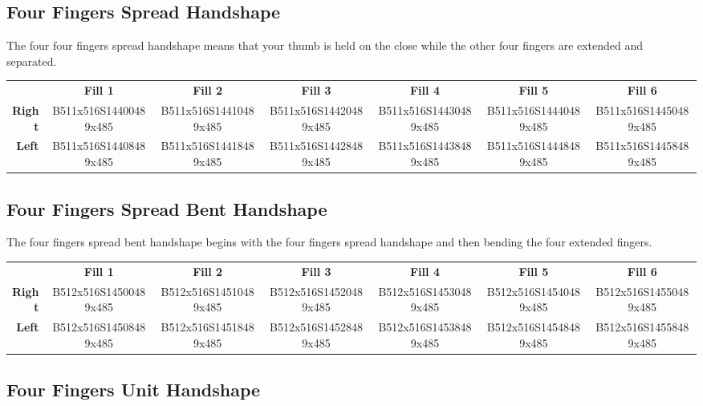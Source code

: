 \documentclass{article}
\begin{document}
\subsection{Four Fingers Spread Handshape}

The four four fingers spread handshape means that your thumb is held on the close while the other four fingers are extended and separated.

\begin{center}
\begin{tabular}{r*{6}{c}}
&\textbf{Fill 1}&\textbf{Fill 2}&\textbf{Fill 3}&\textbf{Fill 4}&\textbf{Fill 5}&\textbf{Fill 6}\\
\textbf{Right}&
B511x516S14400489x485&
B511x516S14410489x485&
B511x516S14420489x485&
B511x516S14430489x485&
B511x516S14440489x485&
B511x516S14450489x485\\
\textbf{Left}&
B511x516S14408489x485&
B511x516S14418489x485&
B511x516S14428489x485&
B511x516S14438489x485&
B511x516S14448489x485&
B511x516S14458489x485\\
\end{tabular}
\end{center}

\subsection{Four Fingers Spread Bent Handshape}

The four fingers spread bent handshape begins with the four fingers spread handshape and then bending the four extended fingers.

\begin{center}
\begin{tabular}{r*{6}{c}}
&\textbf{Fill 1}&\textbf{Fill 2}&\textbf{Fill 3}&\textbf{Fill 4}&\textbf{Fill 5}&\textbf{Fill 6}\\
\textbf{Right}&
B512x516S14500489x485&
B512x516S14510489x485&
B512x516S14520489x485&
B512x516S14530489x485&
B512x516S14540489x485&
B512x516S14550489x485\\
\textbf{Left}&
B512x516S14508489x485&
B512x516S14518489x485&
B512x516S14528489x485&
B512x516S14538489x485&
B512x516S14548489x485&
B512x516S14558489x485\\
\end{tabular}
\end{center}

\subsection{Four Fingers Unit Handshape}
\end{document}
